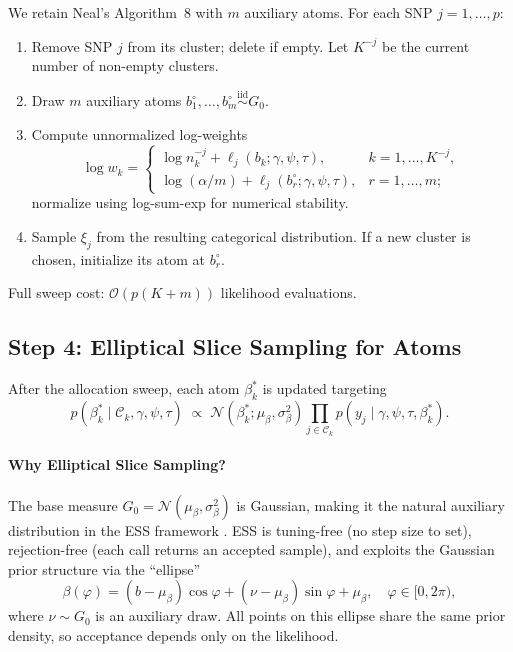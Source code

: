 \documentclass[12pt, a4paper]{article}
\theoremstyle{remark}
\newcommand{\Nor}{\mathcal{N}}
\begin{document}
We retain Neal's Algorithm~8 \cite{Neal2000} with $m$ auxiliary atoms.
For each SNP $j = 1,\ldots,p$:
\begin{enumerate}[leftmargin=*, itemsep=3pt]
  \item Remove SNP $j$ from its cluster; delete if empty.  Let $K^{-j}$
        be the current number of non-empty clusters.
  \item Draw $m$ auxiliary atoms
        $b_1^\circ,\ldots,b_m^\circ \overset{\mathrm{iid}}{\sim} G_0$.
  \item Compute unnormalized log-weights
        \begin{equation}
          \log w_k =
          \begin{cases}
            \log n_k^{-j} + \ell_j(b_k;\gamma,\psi,\tau), &
              k = 1,\ldots,K^{-j},\\[4pt]
            \log(\alpha/m) + \ell_j(b_r^\circ;\gamma,\psi,\tau), &
              r = 1,\ldots,m;
          \end{cases}
        \label{eq:neal8_weights}
        \end{equation}
        normalize using log-sum-exp for numerical stability.
  \item Sample $\xi_j$ from the resulting categorical distribution.
        If a new cluster is chosen, initialize its atom at $b_r^\circ$.
\end{enumerate}
Full sweep cost: $\mathcal{O}(p(K+m))$ likelihood evaluations.

\subsection{Step 4: Elliptical Slice Sampling for Atoms}

After the allocation sweep, each atom $\beta_k^*$ is updated
targeting
\begin{equation}
  p(\beta_k^* \mid \mathcal{C}_k,\gamma,\psi,\tau)
  \;\propto\;
  \Nor(\beta_k^*;\mu_\beta,\sigma_\beta^2)
  \prod_{j\in\mathcal{C}_k} p(y_j \mid \gamma,\psi,\tau,\beta_k^*).
\label{eq:atom_post}
\end{equation}

\paragraph{Why Elliptical Slice Sampling?}
The base measure $G_0 = \Nor(\mu_\beta,\sigma_\beta^2)$ is Gaussian,
making it the natural auxiliary distribution in the ESS framework
\cite{Murray2010}.  ESS is tuning-free (no step size to set),
rejection-free (each call returns an accepted sample), and exploits
the Gaussian prior structure via the ``ellipse''
\begin{equation}
  \beta(\varphi) = (b - \mu_\beta)\cos\varphi + (\nu - \mu_\beta)\sin\varphi + \mu_\beta,
  \quad \varphi \in [0,2\pi),
\label{eq:ellipse}
\end{equation}
where $\nu \sim G_0$ is an auxiliary draw.  All points on this ellipse
share the same prior density, so acceptance depends only on the
likelihood.
\end{document}
